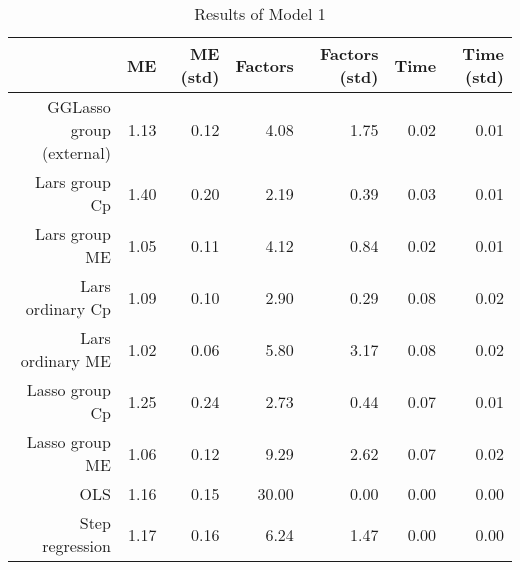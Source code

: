\begin{table}[ht]
\centering
\begin{tabular}{rrrrrrr}
  \hline
 & ME & ME (std) & Factors & Factors (std) & Time & Time (std) \\ 
  \hline
GGLasso group (external) & 1.13 & 0.12 & 4.08 & 1.75 & 0.02 & 0.01 \\ 
  Lars group Cp & 1.40 & 0.20 & 2.19 & 0.39 & 0.03 & 0.01 \\ 
  Lars group ME & 1.05 & 0.11 & 4.12 & 0.84 & 0.02 & 0.01 \\ 
  Lars ordinary Cp & 1.09 & 0.10 & 2.90 & 0.29 & 0.08 & 0.02 \\ 
  Lars ordinary ME & 1.02 & 0.06 & 5.80 & 3.17 & 0.08 & 0.02 \\ 
  Lasso group Cp & 1.25 & 0.24 & 2.73 & 0.44 & 0.07 & 0.01 \\ 
  Lasso group ME & 1.06 & 0.12 & 9.29 & 2.62 & 0.07 & 0.02 \\ 
  OLS & 1.16 & 0.15 & 30.00 & 0.00 & 0.00 & 0.00 \\ 
  Step regression & 1.17 & 0.16 & 6.24 & 1.47 & 0.00 & 0.00 \\ 
   \hline
\end{tabular}
\caption{Results of Model 1} 
\end{table}
